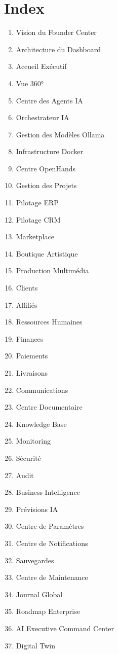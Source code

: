 \documentclass[12pt,a4paper,oneside]{book}
\begin{document}
\chapter{Index}
\begin{enumerate}
\item Vision du Founder Center
\item Architecture du Dashboard
\item Accueil Exécutif
\item Vue 360°
\item Centre des Agents IA
\item Orchestrateur IA
\item Gestion des Modèles Ollama
\item Infrastructure Docker
\item Centre OpenHands
\item Gestion des Projets
\item Pilotage ERP
\item Pilotage CRM
\item Marketplace
\item Boutique Artistique
\item Production Multimédia
\item Clients
\item Affiliés
\item Ressources Humaines
\item Finances
\item Paiements
\item Livraisons
\item Communications
\item Centre Documentaire
\item Knowledge Base
\item Monitoring
\item Sécurité
\item Audit
\item Business Intelligence
\item Prévisions IA
\item Centre de Paramètres
\item Centre de Notifications
\item Sauvegardes
\item Centre de Maintenance
\item Journal Global
\item Roadmap Enterprise
\item AI Executive Command Center
\item Digital Twin
\end{enumerate}
\end{document}
